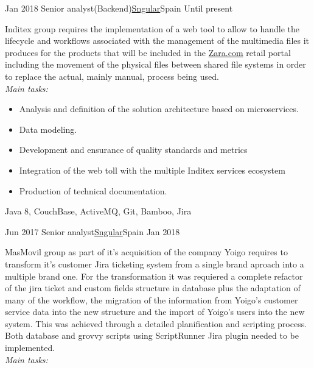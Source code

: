 %
%
%

\begin{experiences}

 \experience
    {Jan 2018} {Senior analyst(Backend)}{\href{https://sngular.com/}{Sngular}}{Spain}
    {Until present}    {

Inditex group requires the implementation of a web tool to allow to handle the lifecycle and workflows associated with the management of the multimedia files it produces for the products that will be included in the {\href{http://Zara.com}{Zara.com}} retail portal including the movement of the physical files between shared file systems in order to replace the actual, mainly manual, process being used.
\\
\emph{Main tasks:}
    	
                      \begin{itemize}
                        \item Analysis and definition of the solution architecture based on microservices.
                        \item Data modeling.
                        \item Development and ensurance of quality standards and metrics
                        \item Integration of the web toll with the multiple Inditex services ecosystem
                        \item Production of technical documentation.
                      \end{itemize}
                    }
                    {Java 8, CouchBase, ActiveMQ, Git, Bamboo, Jira}
                    
  \emptySeparator

 \experience
    {Jun 2017} {Senior analyst}{\href{https://sngular.com/}{Sngular}}{Spain}
    {Jan 2018}    {

MasMovil group as part of it's acquisition of the company Yoigo requires to transform it's customer Jira ticketing system from a single brand aproach into a multiple brand one.
For the transformation it was requiered a complete refactor of the jira ticket and custom fields structure in database plus the adaptation of many of the workflow, the migration of the information from Yoigo's customer service data into the new structure and the import of Yoigo's users into the new system. This was achieved through a detailed planification and scripting process. Both database and grovvy scripts using ScriptRunner Jira plugin needed to be implemented.
\\
\emph{Main tasks:}
    	
}
\end{experiences}
